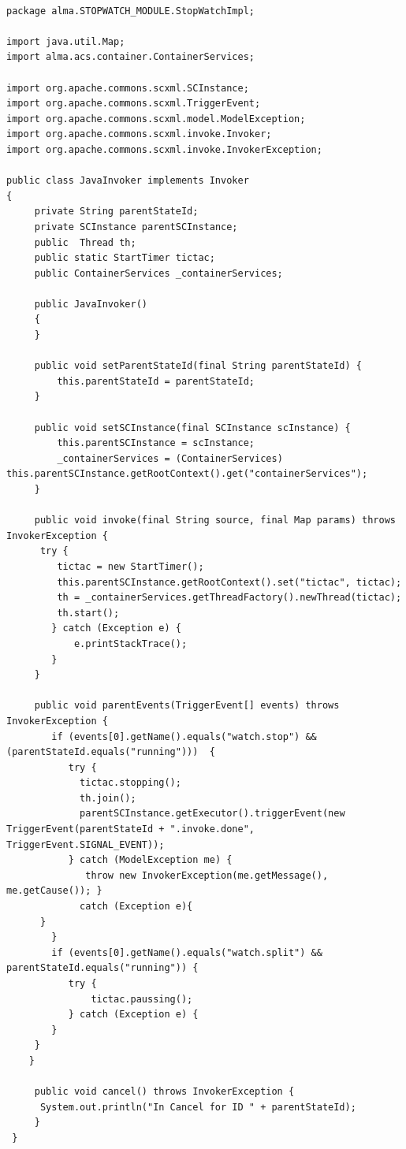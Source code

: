 \documentclass[]{article}
\begin{document}
\begin{lstlisting}

package alma.STOPWATCH_MODULE.StopWatchImpl;

import java.util.Map;
import alma.acs.container.ContainerServices;

import org.apache.commons.scxml.SCInstance;
import org.apache.commons.scxml.TriggerEvent;
import org.apache.commons.scxml.model.ModelException;
import org.apache.commons.scxml.invoke.Invoker;
import org.apache.commons.scxml.invoke.InvokerException;

public class JavaInvoker implements Invoker
{
     private String parentStateId;
     private SCInstance parentSCInstance;
     public  Thread th;
     public static StartTimer tictac;
     public ContainerServices _containerServices;

     public JavaInvoker()
     {
     }     

     public void setParentStateId(final String parentStateId) {
         this.parentStateId = parentStateId;
     }

     public void setSCInstance(final SCInstance scInstance) {
         this.parentSCInstance = scInstance;
         _containerServices = (ContainerServices) this.parentSCInstance.getRootContext().get("containerServices");
     }

     public void invoke(final String source, final Map params) throws InvokerException {
      try {
         tictac = new StartTimer();
         this.parentSCInstance.getRootContext().set("tictac", tictac);
         th = _containerServices.getThreadFactory().newThread(tictac);
         th.start();
        } catch (Exception e) {
            e.printStackTrace();
        }
     }

     public void parentEvents(TriggerEvent[] events) throws InvokerException {
        if (events[0].getName().equals("watch.stop") && (parentStateId.equals("running")))  {
           try {
             tictac.stopping();
             th.join();
             parentSCInstance.getExecutor().triggerEvent(new TriggerEvent(parentStateId + ".invoke.done", TriggerEvent.SIGNAL_EVENT));
           } catch (ModelException me) {
              throw new InvokerException(me.getMessage(), me.getCause()); }
             catch (Exception e){
      }
        }
        if (events[0].getName().equals("watch.split") && parentStateId.equals("running")) {
           try {
               tictac.paussing();
           } catch (Exception e) { 
        }
     }
    }

     public void cancel() throws InvokerException {
      System.out.println("In Cancel for ID " + parentStateId);
     }
 }

\end{lstlisting}	
\end{document}
